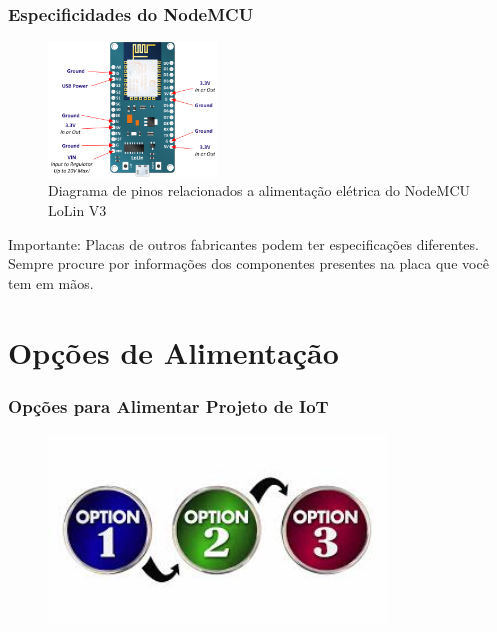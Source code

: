 \documentclass{beamer}
\begin{document}
\begin{frame}
	\frametitle{Especificidades do NodeMCU}
	\begin{minipage}{\textwidth}
		
		\begin{figure}[!ht]
			\centering
			\includegraphics[width=0.4\textwidth]{ESP12-E-Developer-Board-Power-Pinouts.png}
			\caption{Diagrama de pinos relacionados a alimentação elétrica do NodeMCU LoLin V3}
			\label{fig:node_power_pins}
			\vspace{-10pt}
		\end{figure}
		
		\color{red}Importante: \color{black} Placas de outros fabricantes podem ter especificações diferentes. Sempre procure por informações dos componentes presentes na placa que você tem em mãos.
		
	\end{minipage}
\end{frame} 


\section{Opções de Alimentação}

\begin{frame}
\frametitle{Opções para Alimentar Projeto de IoT}
\begin{minipage}{\textwidth}
	\begin{figure}[!ht]
		\centering
		\includegraphics[width=0.8\textwidth]{opcoes.jpeg}
		\label{fig:ndfgode_dfgdpodsdswer_pins}
		\vspace{-10pt}
	\end{figure}
	
\end{minipage}
\end{frame} 
\end{document}
